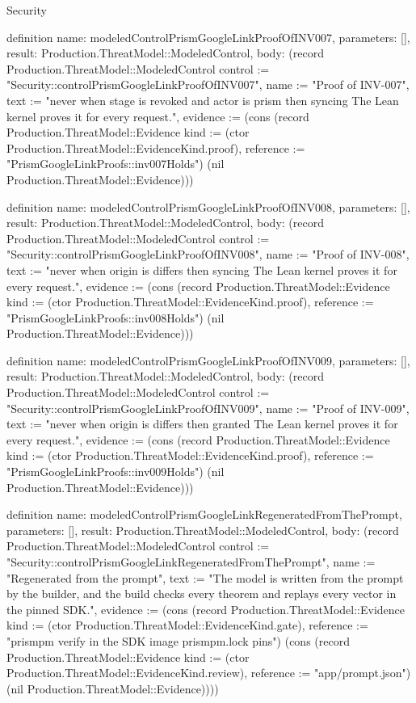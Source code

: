 \begin{lexlean}{Security}
\begin{semanticmodule}
definition{
  name: modeledControlPrismGoogleLinkProofOfINV007,
  parameters: [],
  result: Production.ThreatModel::ModeledControl,
  body: (record Production.ThreatModel::ModeledControl {control := "Security::controlPrismGoogleLinkProofOfINV007", name := "Proof of INV-007", text := "never when stage is revoked and actor is prism then syncing The Lean kernel proves it for every request.", evidence := (cons (record Production.ThreatModel::Evidence {kind := (ctor Production.ThreatModel::EvidenceKind.proof), reference := "PrismGoogleLinkProofs::inv007Holds"}) (nil Production.ThreatModel::Evidence))})
}

definition{
  name: modeledControlPrismGoogleLinkProofOfINV008,
  parameters: [],
  result: Production.ThreatModel::ModeledControl,
  body: (record Production.ThreatModel::ModeledControl {control := "Security::controlPrismGoogleLinkProofOfINV008", name := "Proof of INV-008", text := "never when origin is differs then syncing The Lean kernel proves it for every request.", evidence := (cons (record Production.ThreatModel::Evidence {kind := (ctor Production.ThreatModel::EvidenceKind.proof), reference := "PrismGoogleLinkProofs::inv008Holds"}) (nil Production.ThreatModel::Evidence))})
}

definition{
  name: modeledControlPrismGoogleLinkProofOfINV009,
  parameters: [],
  result: Production.ThreatModel::ModeledControl,
  body: (record Production.ThreatModel::ModeledControl {control := "Security::controlPrismGoogleLinkProofOfINV009", name := "Proof of INV-009", text := "never when origin is differs then granted The Lean kernel proves it for every request.", evidence := (cons (record Production.ThreatModel::Evidence {kind := (ctor Production.ThreatModel::EvidenceKind.proof), reference := "PrismGoogleLinkProofs::inv009Holds"}) (nil Production.ThreatModel::Evidence))})
}

definition{
  name: modeledControlPrismGoogleLinkRegeneratedFromThePrompt,
  parameters: [],
  result: Production.ThreatModel::ModeledControl,
  body: (record Production.ThreatModel::ModeledControl {control := "Security::controlPrismGoogleLinkRegeneratedFromThePrompt", name := "Regenerated from the prompt", text := "The model is written from the prompt by the builder, and the build checks every theorem and replays every vector in the pinned SDK.", evidence := (cons (record Production.ThreatModel::Evidence {kind := (ctor Production.ThreatModel::EvidenceKind.gate), reference := "prismpm verify in the SDK image prismpm.lock pins"}) (cons (record Production.ThreatModel::Evidence {kind := (ctor Production.ThreatModel::EvidenceKind.review), reference := "app/prompt.json"}) (nil Production.ThreatModel::Evidence)))})
}


\end{semanticmodule}
\end{lexlean}
